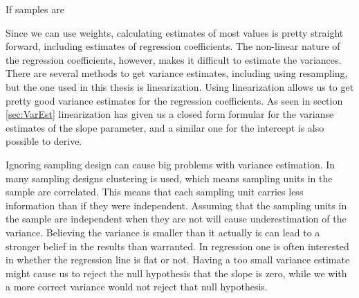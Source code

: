 \documentclass{article}
\begin{document}

If samples are 


Since we can use weights, calculating estimates of most values is pretty
straight forward, including estimates of regression coefficients. The non-linear nature
of the regression coefficients, however, makes it difficult to estimate the
variances. There are several methods to get variance estimates, including using
resampling, but the one used in this thesis is linearization. Using
linearization allows us to get pretty good variance estimates for the regression
coefficients. As seen in section \ref{sec:VarEst} linearization has given us a
closed form formular for the varianse estimates of the slope parameter, and a
similar one for the intercept is also possible to derive.

%

Ignoring sampling design can cause big problems with variance estimation. In
many sampling designs clustering is used, which means sampling units in the sample are correlated. This means
that each sampling unit carries less information than if they were independent.
Assuming that the sampling units in the sample are independent when they are not
will cause underestimation of the variance. Believing the variance is smaller
than it actually is can lead to a stronger belief in the results than warranted.
In regression one is often interested in whether the regression line is flat or
not. Having a too small variance estimate might cause us to reject the null
hypothesis that the slope is zero, while we with a more correct variance would
not reject that null hypothesis.

%
%
%
%
%
\end{document}
